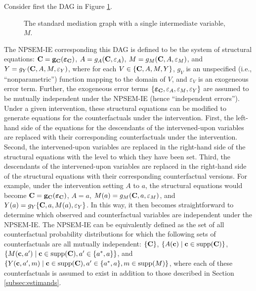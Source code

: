 \documentclass[12pt]{article}
\begin{document}
Consider first the DAG in Figure \ref{fig:DAG1}. 
\begin{figure}[h]
    \centering
    \caption{The standard mediation graph with a single intermediate variable, $M$.\label{fig:DAG1}}
\end{figure}
The NPSEM-IE corresponding this DAG is defined to be the system of structural equations: ${\bf C} = {\bf g_C}(\boldsymbol{\varepsilon}_{\bf C})$, $A = g_A({\bf C}, \varepsilon_A)$, $M = g_M({\bf C}, A, \varepsilon_M)$, and $Y = g_Y({\bf C}, A, M, \varepsilon_Y)$, where for each $V\in\{{\bf C}, A, M, Y\}$, $g_{V}$ is an unspecified (i.e., ``nonparametric'') function mapping to the domain of $V$, and $\varepsilon_{V}$ is an exogeneous error term. Further, the exogeneous error terms $\{\boldsymbol{\varepsilon}_{\bf C}, \varepsilon_A, \varepsilon_M, \varepsilon_Y\}$ are assumed to be mutually independent under the NPSEM-IE (hence ``independent errors''). Under a given intervention, these structural equations can be modified to generate equations for the counterfactuals under the intervention. First, the left-hand side of the equations for the descendants of the intervened-upon variables are replaced with their corresponding counterfactuals under the intervention. Second, the intervened-upon variables are replaced in the right-hand side of the structural equations with the level to which they have been set. Third, the descendants of the intervened-upon variables are replaced in the right-hand side of the structural equations with their corresponding counterfactual versions. For example, under the intervention setting $A$ to $a$, the structural equations would become ${\bf C} = {\bf g_C}(\boldsymbol{\varepsilon}_{\bf C})$, $A = a$, $M(a) = g_M({\bf C}, a, \varepsilon_M)$, and $Y(a) = g_Y\{{\bf C}, a, M(a), \varepsilon_Y\}$. In this way, it then becomes straightforward to determine which observed and counterfactual variables are independent under the NPSEM-IE. The NPSEM-IE can be equivalently defined as the set of all counterfactual probability distributions  for which the following sets of counterfactuals are all mutually independent: $\{{\bf C}\}$, $\{A({\bf c}) \mid {\bf c}\in\text{supp}({\bf C})\}$, $\{M({\bf c},a') \mid {\bf c}\in\text{supp}({\bf C}),a'\in\{a^*,a\}\}$, and $\{Y({\bf c},a',m) \mid {\bf c}\in\text{supp}({\bf C}),a'\in\{a^*,a\},m\in\text{supp}(M)\}$, where each of these counterfactuals is assumed to exist in addition to those described in Section \ref{subsec:estimands}.
\end{document}
